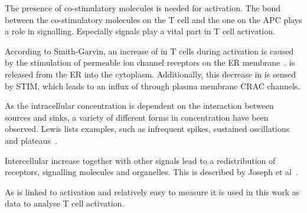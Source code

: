 The presence of co-stimulatory molecules is needed for activation. The bond between the co-stimulatory molecules on the T cell and the one on the APC plays a role in signalling. Especially \Calcium signals play a vital part in T cell activation.

According to Smith-Garvin, an increase of \Calcium in T cells during activation is caused by the stimulation of \Calcium permeable ion channel receptors on the ER membrane~\cite{smith2009}. \Calcium is released from the ER into the cytoplasm. Additionally, this decrease in \Calcium is sensed by STIM, which leads to an influx of \Calcium through plasma membrane CRAC channels.

As the intracellular \Calcium concentration is dependent on the interaction between \Calcium sources and sinks, a variety of different forms in \Calcium concentration have been observed. Lewis lists examples, such as infrequent spikes, sustained oscillations and plateaus~\cite{Lewis2001}.

Intercellular \Calcium increase together with other signals lead to a redistribution of receptors, signalling molecules and organelles. This is described by Joseph et al~\cite{joseph2014}.

As \Calcium is linked to activation and relatively easy to measure it is used in this work as data to analyse T cell activation.